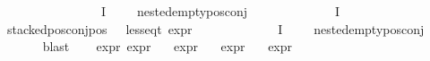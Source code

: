\begin{isabellebody}
\ \ \ \ \ \ \ \ \ \ \ {\isacharparenleft}{\kern0pt}{\isasymforall}{\isasympsi}\ {\isasymin}\ {\isasymPhi}\ {\isacharbackquote}{\kern0pt}\ I{\isachardot}{\kern0pt}\ {\isasympsi}\ {\isasymnoteq}\ {\isasymphi}\ {\isasymlongrightarrow}\ nested{\isacharunderscore}{\kern0pt}empty{\isacharunderscore}{\kern0pt}pos{\isacharunderscore}{\kern0pt}conj\ {\isasympsi}{\isacharparenright}{\kern0pt}{\isacharparenright}{\kern0pt}{\isachardoublequoteclose}\isanewline
\ \ \isamarkupfalse%
\ {}\ \isamarkupfalse%
\ {\isasymphi}\ \ {\isachardoublequoteopen}{\isasymphi}\ {\isasymin}\ {\isasymPhi}\ {\isacharbackquote}{\kern0pt}\ I{\isachardoublequoteclose}\ \isanewline
{\isachardoublequoteopen}{\isacharparenleft}{\kern0pt}stacked{\isacharunderscore}{\kern0pt}pos{\isacharunderscore}{\kern0pt}conj{\isacharunderscore}{\kern0pt}pos\ {\isasymphi}\ {\isasymand}\ less{\isacharunderscore}{\kern0pt}eq{\isacharunderscore}{\kern0pt}t\ {\isacharparenleft}{\kern0pt}expr\ {\isasymphi}{\isacharparenright}{\kern0pt}\ {\isacharparenleft}{\kern0pt}{}{\isacharcomma}{\kern0pt}\ {\isasyminfinity}{\isacharcomma}{\kern0pt}\ {}{\isacharcomma}{\kern0pt}\ {}{\isacharcomma}{\kern0pt}\ {}{\isacharcomma}{\kern0pt}\ {}{\isacharparenright}{\kern0pt}{\isacharparenright}{\kern0pt}{\isachardoublequoteclose}\isanewline
\ \ \ \ {\isachardoublequoteopen}{\isacharparenleft}{\kern0pt}{\isasymforall}{\isasympsi}{\isasymin}{\isasymPhi}\ {\isacharbackquote}{\kern0pt}\ I{\isachardot}{\kern0pt}\ {\isasympsi}\ {\isasymnoteq}\ {\isasymphi}\ {\isasymlongrightarrow}\ nested{\isacharunderscore}{\kern0pt}empty{\isacharunderscore}{\kern0pt}pos{\isacharunderscore}{\kern0pt}conj\ {\isasympsi}{\isacharparenright}{\kern0pt}{\isachardoublequoteclose}\isanewline
\ \ \ \ \isamarkupfalse%
\ blast\isanewline
\ \ \isamarkupfalse%
\ expr{\isacharunderscore}{\kern0pt}{\isasymphi}{\isacharcolon}{\kern0pt}\ {\isachardoublequoteopen}expr{\isacharunderscore}{\kern0pt}{}\ {\isasymphi}\ {\isasymle}\ {}{\isachardoublequoteclose}\isanewline
{\isachardoublequoteopen}expr{\isacharunderscore}{\kern0pt}{}\ {\isasymphi}\ {\isasymle}\ {\isasyminfinity}{\isachardoublequoteclose}\isanewline
{\isachardoublequoteopen}expr{\isacharunderscore}{\kern0pt}{}\ {\isasymphi}\ {\isasymle}\ {}{\isachardoublequoteclose}\isanewline
{\isachardoublequoteopen}expr{\isacharunderscore}{\kern0pt}{}\ {\isasymphi}\ {\isasymle}\ {}{\isachardoublequoteclose}\isanewline

\end{isabellebody}
